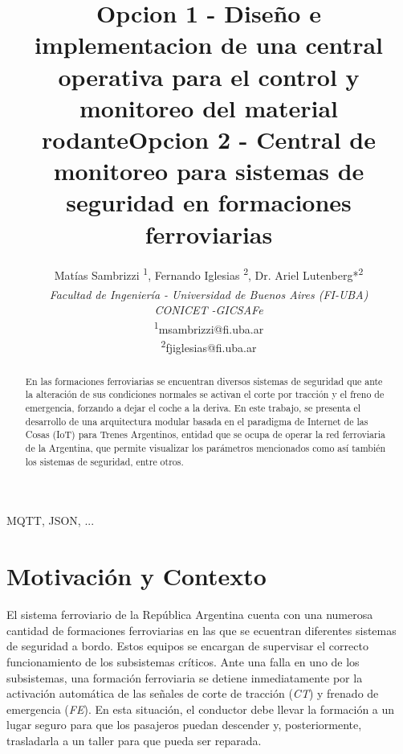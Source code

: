 \documentclass[a4paper]{IEEEtran}
\begin{document}
\title{Opcion 1 - Diseño e implementacion de una central operativa para el control y monitoreo del material rodante}

\title{Opcion 2 - Central de monitoreo para sistemas de seguridad en formaciones ferroviarias \\}


\author{

Matías Sambrizzi\textsuperscript{\dag} \textsuperscript{1}, 
Fernando Iglesias\textsuperscript{\dag} \textsuperscript{2}, 
Dr. Ariel Lutenberg*\textsuperscript{2} \\

\textsuperscript{\dag} \textit{Facultad de Ingeniería - Universidad de Buenos Aires (FI-UBA)} \\
\normalsize * \textit{CONICET -GICSAFe} \\

\textsuperscript{1}\small msambrizzi@fi.uba.ar \\
\textsuperscript{2}\small fjiglesias@fi.uba.ar \\

}


\maketitle

\begin{abstract}

En las formaciones ferroviarias se encuentran diversos sistemas de seguridad que ante la alteración de sus condiciones normales se activan el corte por tracción y el freno de emergencia, forzando a dejar el coche a la deriva. En este trabajo, se presenta el desarrollo de una arquitectura modular basada en el paradigma de Internet de las Cosas (IoT) para Trenes Argentinos, entidad que se ocupa de operar la red ferroviaria de la Argentina, que permite visualizar los parámetros mencionados como así también los sistemas de seguridad, entre otros.


\end{abstract}

\begin{IEEEkeywords}
MQTT, JSON, ...
\end{IEEEkeywords}


\section{Motivación y Contexto}

El sistema ferroviario de la República Argentina cuenta con una numerosa cantidad de formaciones ferroviarias en las que se ecuentran diferentes sistemas de seguridad a bordo. Estos equipos se encargan de supervisar el correcto funcionamiento de los subsistemas críticos. Ante una falla en uno de los subsistemas, una formación ferroviaria se detiene inmediatamente por la activación automática de las señales de corte de tracción (\textit{CT}) y frenado de emergencia (\textit{FE}). En esta situación, el conductor debe llevar la formación a un lugar seguro para que los pasajeros puedan descender y, posteriormente, trasladarla a un taller para que pueda ser reparada.
\\
\end{document}
